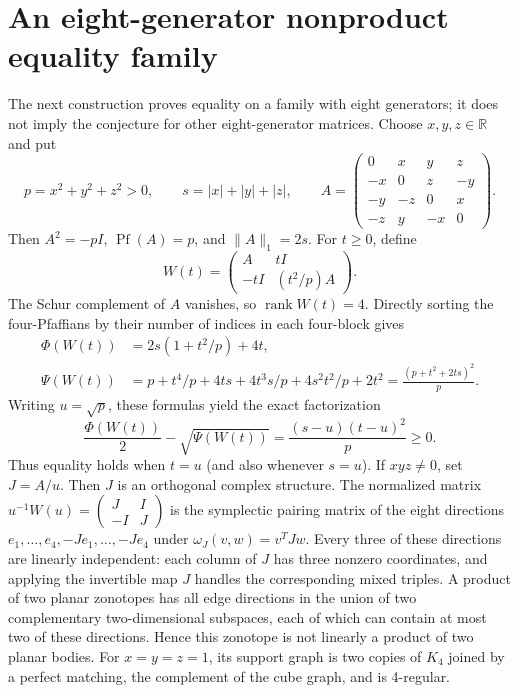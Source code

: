 \documentclass[11pt]{article}
\newcommand{\R}{\mathbb R}
\newcommand{\pf}{\operatorname{Pf}}
\begin{document}
\section{An eight-generator nonproduct equality family}
The next construction proves equality on a family with eight generators; it does not imply the conjecture for other eight-generator matrices. Choose $x,y,z\in\R$ and put
\[
 p=x^2+y^2+z^2>0,\qquad s=|x|+|y|+|z|,\qquad
 A=\begin{pmatrix}
 0&x&y&z\\-x&0&z&-y\\-y&-z&0&x\\-z&y&-x&0
 \end{pmatrix}.
\]
Then $A^2=-pI$, $\pf(A)=p$, and $\|A\|_1=2s$. For $t\geq0$, define
\[
 W(t)=\begin{pmatrix}A&tI\\-tI&(t^2/p)A\end{pmatrix}.
\]
The Schur complement of $A$ vanishes, so $\operatorname{rank}W(t)=4$. Directly sorting the four-Pfaffians by their number of indices in each four-block gives
\begin{align*}
 \Phi(W(t))&=2s(1+t^2/p)+4t,\\
 \Psi(W(t))&=p+t^4/p+4ts+4t^3s/p+4s^2t^2/p+2t^2
             =\frac{(p+t^2+2ts)^2}{p}.
\end{align*}
Writing $u=\sqrt p$, these formulas yield the exact factorization
\[
 \frac{\Phi(W(t))}{2}-\sqrt{\Psi(W(t))}
       =\frac{(s-u)(t-u)^2}{p}\geq0.
\]
Thus equality holds when $t=u$ (and also whenever $s=u$). If $xyz\ne0$, set $J=A/u$. Then $J$ is an orthogonal complex structure. The normalized matrix $u^{-1}W(u)=\left(\begin{smallmatrix}J&I\\-I&J\end{smallmatrix}\right)$ is the symplectic pairing matrix of the eight directions $e_1,\ldots,e_4,-Je_1,\ldots,-Je_4$ under $\omega_J(v,w)=v^TJw$. Every three of these directions are linearly independent: each column of $J$ has three nonzero coordinates, and applying the invertible map $J$ handles the corresponding mixed triples. A product of two planar zonotopes has all edge directions in the union of two complementary two-dimensional subspaces, each of which can contain at most two of these directions. Hence this zonotope is not linearly a product of two planar bodies. For $x=y=z=1$, its support graph is two copies of $K_4$ joined by a perfect matching, the complement of the cube graph, and is 4-regular.
\end{document}
